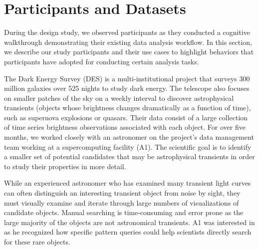 \section{Participants and Datasets}
During the design study, we observed participants as they conducted a cognitive walkthrough demonstrating their existing data analysis workflow. In this section, we describe our study participants and their use cases to highlight behaviors that participants have adopted for conducting certain analysis tasks.
\par\noindent{} The Dark Energy Survey (DES) is a multi-institutional project that surveys 300 million galaxies over 525 nights to study dark energy\cite{Drlica-Wagner2017}. The telescope also focuses on smaller patches of the sky on a weekly interval to discover astrophysical transients (objects whose brightness changes dramatically as a function of time), such as supernova explosions or quasars. Their data consist of a large collection of time series brightness observations associated with each object. For over five months, we worked closely with an astronomer on the project's data management team working at a supercomputing facility (A1). The scientific goal is to identify a smaller set of potential candidates that may be astrophysical transients in order to study their properties in more detail. 
\par While an experienced astronomer who has examined many transient light curves can often distinguish an interesting transient object from noise by sight, they must visually examine and iterate through large numbers of visualizations of candidate objects. Manual searching is time-consuming and error prone as the large majority of the objects are not astronomical transients. A1 was interested in \zv as he recognized how specific pattern queries could help scientists directly search for these rare objects. 
